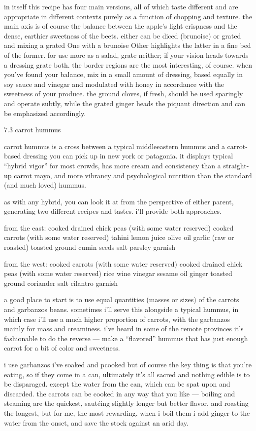 in itself this recipe has four main versions, all of which taste different and are appropriate in different contexts purely as a function of chopping and texture. the main axis is of course the balance between the apple's light crispness and the dense, earthier sweetness of the beets. either can be diced (brunoise) or grated and mixing a grated One with a brunoise Other highlights the latter in a fine bed of the former.
	for use more as a salad, grate neither; if your vision heads towards a dressing grate both. the border regions are the most interesting, of course. when you've found your balance, mix in a small amount of dressing, based equally in soy sauce and vinegar and modulated with honey in accordance with the sweetness of your produce. the ground cloves, if fresh, should be used sparingly and operate subtly, while the grated ginger heads the piquant direction and can be emphasized accordingly. 

7.3  carrot hummus

carrot hummus is a cross between a typical middleeastern hummus and a carrot-based dressing you can pick up in new york or patagonia. it displays typical ``hybrid vigor'' for most crowds, has more cream and consistency than a straight-up carrot mayo, and more vibrancy and psychological nutrition than the standard (and much loved) hummus.

as with any hybrid, you can look it at from the perspective of either parent, generating two different recipes and tastes. i'll provide both approaches.

from the east:
	cooked drained chick peas (with some water reserved)
	cooked carrots (with some water reserved)
	tahini
	lemon juice
	olive oil
	garlic (raw or roasted)
	toasted ground cumin seeds
	salt
	parsley garnish

from the west:
	cooked carrots (with some water reserved)
	cooked drained chick peas (with some water reserved)
	rice wine vinegar
	sesame oil
	ginger
	toasted ground coriander
	salt
	cilantro garnish

a good place to start is to use equal quantities (masses or sizes) of the carrots and garbanzos beans. sometimes i'll serve this alongside a typical hummus, in which case i'll use a much higher proportion of carrots, with the garbanzos mainly for mass and creaminess. i've heard in some of the remote provinces it's fashionable to do the reverse --- make a ``flavored'' hummus that has just enough carrot for a bit of color and sweetness.

i use garbanzos i've soaked and pcooked but of course the key thing is that you're eating, so if they come in a can, ultimately it's all sacred and nothing edible is to be disparaged. except the water from the can, which can be spat upon and discarded. the carrots can be cooked in any way that you like --- boiling and steaming are the quickest, saut\'{e}ing slightly longer but better flavor, and roasting the longest, but for me, the most rewarding. when i boil them i add ginger to the water from the onset, and save the stock against an arid day.

